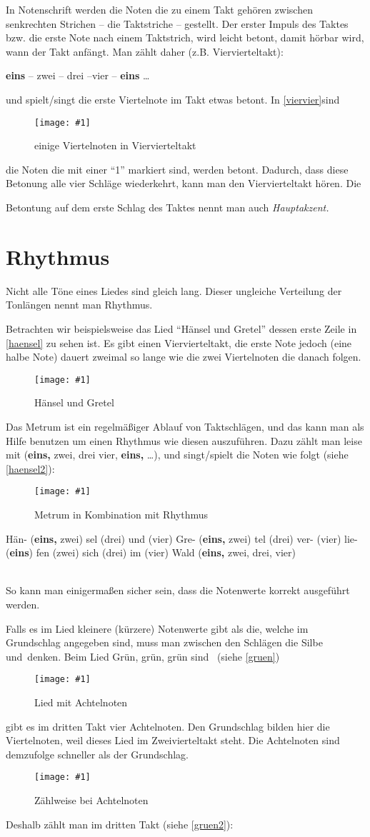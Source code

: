 \documentclass[10pt,a4paper,twoside]{report}
\newcommand{\comment}[1]{
	\marginpar{
		\textsf{#1}
	}
}
\newcommand{\image}[4]{
	\begin{figure}[!ht]
		\centering
		\texttt{[image: \#1]}
		\caption{#2}
		\label{#3}
	\end{figure}
}
\newcommand{\myquote}[1]{
	\hspace{15mm}
	\parbox{100mm}{
		#1
	}
	\ \\
}
\begin{document}
In Notenschrift werden die Noten die zu einem Takt gehören zwischen senkrechten 
Strichen -- die Taktstriche -- gestellt.
Der erster Impuls des Taktes bzw. die erste Note nach einem Taktstrich, wird
leicht betont, damit hörbar wird, wann der Takt anfängt. Man zählt daher (z.B. 
Viervierteltakt):

\hspace{2cm}\textbf{eins} -- zwei -- drei --vier -- \textbf{eins} \dots

und spielt/singt die erste Viertelnote im Takt etwas betont. In 
\autoref{viervier}sind
\image{lilypond/viervier.png}{einige Viertelnoten in
    Viervierteltakt}{viervier}{6}
die Noten die mit einer "`1"' markiert sind, werden betont. Dadurch, dass diese
Betonung alle vier Schläge wiederkehrt, kann man den Viervierteltakt 
hören. Die  
\comment{Hauptakzent}Betontung auf dem erste Schlag des 
Taktes nennt man auch \emph{Hauptakzent.}

\section{Rhythmus}
Nicht alle Töne eines Liedes sind gleich lang. Dieser ungleiche Verteilung der 
Tonlängen nennt man Rhythmus.\comment{Rhythmus}
Betrachten wir beispielsweise das Lied "`Hänsel
und Gretel"' dessen erste Zeile in \autoref{haensel} zu sehen ist. %
Es gibt einen Viervierteltakt,
die erste Note jedoch (eine halbe Note) dauert zweimal so lange wie die zwei
Viertelnoten die danach folgen. 
\image{lilypond/haensel.png}{Hänsel und Gretel}{haensel}{10}%

Das Metrum ist ein regelmäßiger Ablauf von Taktschlägen,
und das kann man als Hilfe benutzen um einen Rhythmus wie diesen auszuführen.
Dazu zählt man leise mit (\textbf{eins,} zwei, drei vier, \textbf{eins,} \dots),
und singt/spielt die Noten wie folgt (siehe \autoref{haensel2}):
\image{lilypond/haensel2.png}{Metrum in Kombination mit Rhythmus}{haensel2}{10}

\myquote{
	Hän- {\footnotesize (\textbf{eins,} zwei)} sel {\footnotesize (drei)} und 
	{\footnotesize (vier)} Gre- {\footnotesize (\textbf{eins,} zwei)}
	tel {\footnotesize (drei)} ver- {\footnotesize (vier)} lie- 
	{\footnotesize (\textbf{eins})} fen {\footnotesize (zwei)} sich 
	{\footnotesize (drei)} im {\footnotesize (vier)}
	Wald {\footnotesize (\textbf{eins,} zwei, drei, vier)}
}

So kann man einigermaßen sicher sein, dass die Notenwerte korrekt ausgeführt 
werden.

Falls es im Lied kleinere (kürzere) Notenwerte gibt als die, welche im Grundschlag 
angegeben sind, muss man zwischen den Schlägen die Silbe \glqq und\grqq\ denken. 
Beim Lied \glqq Grün, grün, grün sind \textellipsis\grqq\ (siehe \autoref{gruen})
\image{lilypond/gruen.png}{Lied mit Achtelnoten}{gruen}{10}
gibt es im dritten Takt vier Achtelnoten. Den Grundschlag bilden hier die 
Viertelnoten, weil dieses Lied im Zweivierteltakt steht. Die Achtelnoten sind 
demzufolge schneller als der Grundschlag.
\image{lilypond/gruen2.png}{Zählweise bei Achtelnoten}{gruen2}{11}
Deshalb zählt man im dritten Takt (siehe \autoref{gruen2}):
\end{document}
